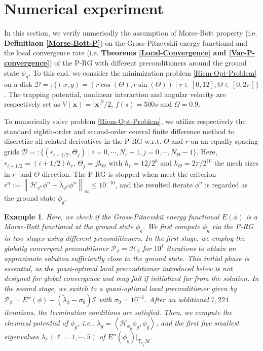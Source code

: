 \documentclass[preprint,3p]{elsarticle}
\newtheorem{exmp}{Example}[section]
\begin{document}
\section{Numerical experiment}
\label{Sec5} 
In this section, we  verify numerically the  assumption of Morse-Bott property (i.e. \textbf{Definitiaon \ref{Morse-Bott-P}}) on the Gross-Pitaevskii energy functional    
and the  local convergence rate (i.e. \textbf{Theorems \ref{Local-Convergence} and \ref{Var-P-convergence}}) of the P-RG with different preconditioners around 
the ground state $\phi_g$.  To this end, we consider the minimization problem \eqref{Riem-Opt-Problem} on a disk 
$\mathcal{D} =: \big\{(x,y)=(r\cos(\Theta), r\sin(\Theta)) \mid r\in[0, 12], \Theta\in[0, 2\pi] \big\}$.
The trapping potential, nonlinear interaction and  angular velocity are respectively set as 
$V(\bm{x}) = |\bm{x}|^2 / 2$,   $f(s) = 500 s$ and  $\Omega = 0.9$. 

\vspace{0.3cm}

To numerically solve  problem \eqref{Riem-Opt-Problem},  we utilize respectively the standard   eighth-order and second-order central finite  difference method to discretize 
all related derivatives in the P-RG w.r.t. $\Theta$ and $r$
on   an equally-spacing grids  $\widetilde{\mathcal{D}}=:\big\{(r_{i+1/2}, \Theta_j) \mid i=0,\cdots, N_r-1, j=0,\cdots, N_\Theta-1 \big\}$. Here, 
$r_{i+1/2}=(i+1/2) h_r$, $\Theta_j=j h_\Theta$ with  $h_r=12/2^8$ and $ h_\Theta=2\pi/2^{10}$ the mesh sizes in $r$- and $\Theta$-direction. 
The P-RG is stopped when meet the  criterion $r^n := \left\|\mathcal{H}_{\phi^n}\phi^n-\widetilde{\lambda}_{\phi^n}\phi^n\right\|_{\infty} \le 10^{-10}$, and the resulted iterate $\phi^n$ is regarded as
the ground state $\phi_g$.

\begin{exmp}
	\label{eg:MB_prop}
	Here, we check if the Gross-Pitaevskii energy functional $E(\phi)$ is a Morse-Bott functional 
	at the ground state $\phi_g$. We first compute $\phi_g$ via the P-RG in two stages using different preconditioners. In the first stage, {we employ the globally convergent preconditioner $\mathcal{P}_\phi = \mathcal{H}_{\phi}$ for $10^{4}$ iterations to obtain an approximate solution sufficiently close to the ground state. 
	This initial phase is essential, as the quasi-optimal local preconditioner introduced below is not designed for global convergence and may fail if initialized far from the solution.} In the second stage, we switch to a quasi-optimal local preconditioner given by $\mathcal{P}_\phi = E''(\phi) - (\widetilde{\lambda}_{\phi} - \sigma_0)\mathcal{I}$ with $\sigma_0 = 10^{-1}$. After an additional $7,224$ iterations, the termination conditions are satisfied. Then, we compute the chemical potential of $\phi_g$, i.e., $\lambda_g=\left\langle\mathcal{H}_{\phi_g}\phi_g,\phi_g\right\rangle$, and 
	the first five smallest eigenvalues $\lambda_\ell\, (\ell=1, \cdots, 5)$ of $E''(\phi_g)|_{T_{\phi_g}\mathcal{M}}$. 
\end{exmp} 
\end{document}
